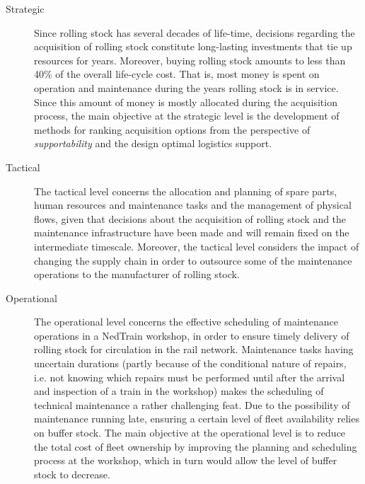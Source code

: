 	\begin{description}
	\item[Strategic]
	Since rolling stock has several decades of life-time,
	decisions regarding the acquisition of rolling stock constitute long-lasting investments that tie up resources for years.
	Moreover, buying rolling stock amounts to less than 40\% of the overall life-cycle cost.
	That is, most money is spent on operation and maintenance during the years rolling stock is in service.
	Since this amount of money is mostly allocated during the acquisition process,		
	the main objective at the strategic level is the development of methods for
	ranking acquisition options from the perspective of \emph{supportability} and the design optimal logistics support.
	
	\item[Tactical]
	The tactical level concerns the allocation and planning of spare parts, 
	human resources and maintenance tasks and the management of physical flows,
	given that decisions about the acquisition of rolling stock 
	and the maintenance infrastructure have been made and will remain fixed on the intermediate timescale.
	Moreover, the tactical level considers the impact of changing the supply chain in order to
	outsource some of the maintenance operations to the manufacturer of rolling stock.
	
	\item[Operational]
	The operational level concerns the effective scheduling of maintenance operations in a NedTrain workshop,
	in order to ensure timely delivery of rolling stock for circulation in the rail network.
	Maintenance tasks having uncertain durations
	(partly because of the conditional nature of repairs, i.e. not knowing which repairs must be performed until
	after the arrival and inspection of a train in the workshop) makes the scheduling of technical maintenance a rather challenging feat.
	Due to the possibility of maintenance running late,
	ensuring a certain level of fleet availability relies on buffer stock.		
	The main objective at the operational level is to reduce the total cost of fleet ownership
	by improving the planning and scheduling process at the workshop,
	which in turn would allow the level of buffer stock to decrease.	
	\end{description}
	 
